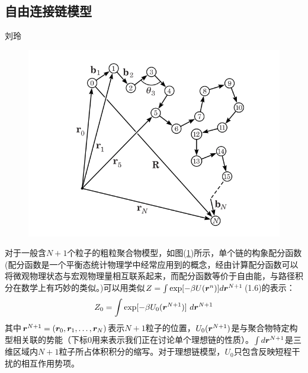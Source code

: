\subsection{自由连接链模型}

\begin{center}
刘玲
\end{center}

\begin{figure}[H]
	\centering   
	\includegraphics[width=12cm]{./figures/2-1.png}
	\caption{ }
	\label{2.1}
\end{figure}

对于一般含$N+1$个粒子的粗粒聚合物模型，如图(\ref{2.1})所示，单个链的构象配分函数(配分函数是一个平衡态统计物理学中经常应用到的概念，经由计算配分函数可以将微观物理状态与宏观物理量相互联系起来，而配分函数等价于自由能，与路径积分在数学上有巧妙的类似。)可以用类似$Z=\int \exp[-\beta U(\bm{r}^{n})] d \bm{r}^{N+1}$(1.6)的表示：\\
\begin{equation}
Z_0 = \int \exp[-\beta U_{0}({\bm{r}}^{N+1})] ~d \bm{r}^{N+1}
\label{2.3}
\end{equation}
其中$\bm{r}^{N+1}=(\bm{r}_0,\bm{r}_1,\ldots,\bm{r}_{N})$表示$N+1$粒子的位置，$U_0(\bm{r}^{N+1})$是与聚合物特定构型相关联的势能（下标$0$用来表示我们正在讨论单个理想链的性质）。$\int d\bm{r}^{N+1}$是三维区域内$N+1$粒子所占体积积分的缩写。对于理想链模型，$U_0$只包含反映短程干扰的相互作用势项。\\

